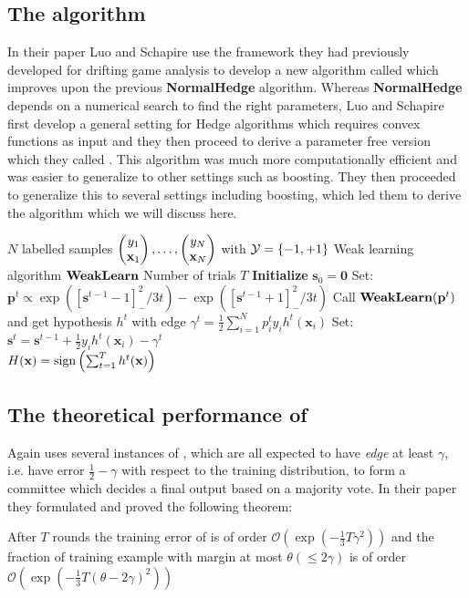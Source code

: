 \subsection{The algorithm}
\label{subsec:NHAlgo}
In their paper \cite{Luo2014} Luo and Schapire use the framework they had previously developed for drifting game analysis to develop a new algorithm called \adaN which improves upon the previous \textbf{NormalHedge} algorithm. Whereas \textbf{NormalHedge} depends on a numerical search to find the right parameters, Luo and Schapire first develop a general setting for Hedge algorithms which requires convex functions as input and they then proceed to derive a parameter free version which they called \adaN. This algorithm was much more computationally efficient and was easier to generalize to other settings such as boosting. They then proceeded to generalize this to several settings including boosting, which led them to derive the \NHB algorithm which we will discuss here. 
\begin{algorithm} 
\caption{\NHB}
\label{fig:adaNCode}
\begin{algorithmic}[1]
\Require 
\Statex $N$ labelled samples $\Vec{y_1\\ \mathbf x_1},\ldots,\Vec{y_N\\ \mathbf x_N}$  with $\mathcal Y = \set{-1,+1}$ 
\Statex Weak learning algorithm $\weak$
\Statex Number of trials $T$
\Procedure{\adaN}{}
\State \textbf{Initialize} $\mathbf{s}_0 = \mathbf 0$
\State Set: $\mathbf p^t \propto \exp([\mathbf s^{t-1}-1]_-^2/3t) - \exp([\mathbf s^{t-1}+1]_-^2/3t) $ 
\State Call $\weak(\mathbf p^t)$ and get hypothesis $h^t$ with edge $\gamma^t = \frac12\sum_{i=1}^Np^t_iy_ih^t(\mathbf x_i)$
\State Set: $\mathbf s^t = \mathbf s^{t-1} + \frac12 y_ih^t(\mathbf x_i)-\gamma^t$
\EndFor\\
\Return $H(\mathbf x) = \sign\lubke{\sum^T_{t=1}h^t(\mathbf{x})}$
\EndProcedure
\end{algorithmic}
\end{algorithm}

\subsection{The theoretical performance of \NHB}
\label{subsec:NHTheoPerf}
Again \NHB uses several instances of \weak, which are all expected to have \textit{edge} at least $\gamma$, i.e. have error $\frac12 - \gamma$ with respect to the training distribution, to form a committee which decides a final output based on a majority vote. In their paper they formulated and proved the following theorem: 
 \begin{theorem}\label{Thm:NHBPerf}\cite{Luo2014}
 After $T$ rounds the training error of \NHB is of order $\mathcal{O}(\exp(-\frac13T\gamma^2))$ and the fraction of training example with margin at most $\theta(\leq2\gamma)$ is of order $\mathcal{O}(\exp(-\frac13T(\theta-2\gamma)^2))$

 \end{theorem}

